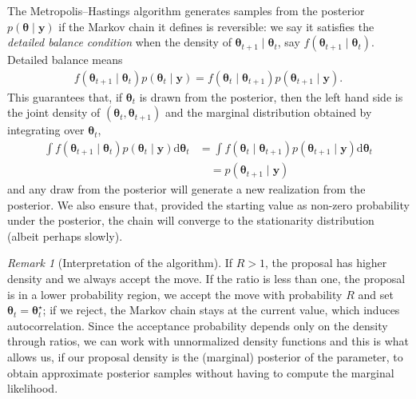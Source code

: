 \documentclass[
  11pt,
  letterpaper,
]{scrbook}
\theoremstyle{definition}
\theoremstyle{definition}
\theoremstyle{definition}
\theoremstyle{plain}
\theoremstyle{plain}
\theoremstyle{remark}
\newtheorem*{remark}{Remark}
\begin{document}
The Metropolis--Hastings algorithm generates samples from the posterior
\(p(\boldsymbol{\theta} \mid \boldsymbol{y})\) if the Markov chain it
defines is reversible: we say it satisfies the \emph{detailed balance
condition} when the density of
\(\boldsymbol{\theta}_{t+1} \mid \boldsymbol{\theta}_{t}\), say
\(f(\boldsymbol{\theta}_{t+1} \mid \boldsymbol{\theta}_{t})\). Detailed
balance means \begin{align*}
f(\boldsymbol{\theta}_{t+1} \mid \boldsymbol{\theta}_{t})p(\boldsymbol{\theta}_{t} \mid \boldsymbol{y}) = f(\boldsymbol{\theta}_{t} \mid \boldsymbol{\theta}_{t+1})p(\boldsymbol{\theta}_{t+1} \mid \boldsymbol{y}).
\end{align*} This guarantees that, if \(\boldsymbol{\theta}_{t}\) is
drawn from the posterior, then the left hand side is the joint density
of \((\boldsymbol{\theta}_{t}, \boldsymbol{\theta}_{t+1})\) and the
marginal distribution obtained by integrating over
\(\boldsymbol{\theta}_{t}\), \begin{align*}
\int f(\boldsymbol{\theta}_{t+1} \mid \boldsymbol{\theta}_{t})p(\boldsymbol{\theta}_{t} \mid \boldsymbol{y})\mathrm{d} \boldsymbol{\theta}_{t}
& = \int f(\boldsymbol{\theta}_{t} \mid \boldsymbol{\theta}_{t+1})p(\boldsymbol{\theta}_{t+1} \mid \boldsymbol{y})\mathrm{d} \boldsymbol{\theta}_{t} 
\\&\quad= p(\boldsymbol{\theta}_{t+1} \mid \boldsymbol{y})
\end{align*} and any draw from the posterior will generate a new
realization from the posterior. We also ensure that, provided the
starting value as non-zero probability under the posterior, the chain
will converge to the stationarity distribution (albeit perhaps slowly).

\begin{remark}[Interpretation of the algorithm]
If \(R>1\), the proposal has higher density and we always accept the
move. If the ratio is less than one, the proposal is in a lower
probability region, we accept the move with probability \(R\) and set
\(\boldsymbol{\theta}_{t}=\boldsymbol{\theta}^{\star}_t\); if we reject,
the Markov chain stays at the current value, which induces
autocorrelation. Since the acceptance probability depends only on the
density through ratios, we can work with unnormalized density functions
and this is what allows us, if our proposal density is the (marginal)
posterior of the parameter, to obtain approximate posterior samples
without having to compute the marginal likelihood.
\end{remark}
\end{document}
